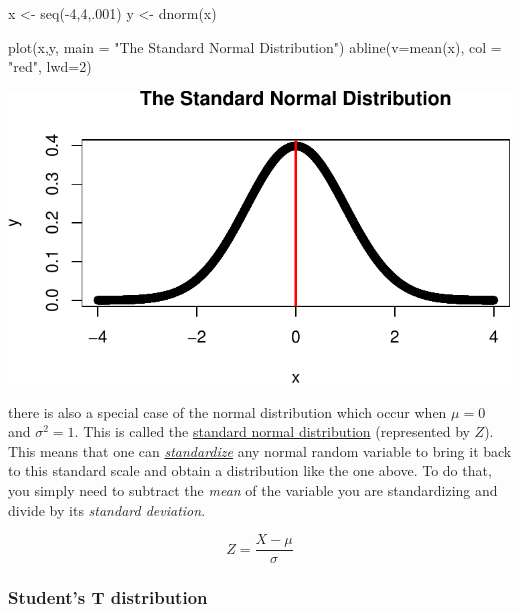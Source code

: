 \documentclass[
  letterpaper,
  DIV=11,
  numbers=noendperiod]{scrartcl}
\newenvironment{Shaded}{\begin{snugshade}}{\end{snugshade}}
\newcommand{\AttributeTok}[1]{\textcolor[rgb]{0.40,0.45,0.13}{#1}}
\newcommand{\DecValTok}[1]{\textcolor[rgb]{0.68,0.00,0.00}{#1}}
\newcommand{\FunctionTok}[1]{\textcolor[rgb]{0.28,0.35,0.67}{#1}}
\newcommand{\NormalTok}[1]{\textcolor[rgb]{0.00,0.23,0.31}{#1}}
\newcommand{\OtherTok}[1]{\textcolor[rgb]{0.00,0.23,0.31}{#1}}
\newcommand{\SpecialCharTok}[1]{\textcolor[rgb]{0.37,0.37,0.37}{#1}}
\newcommand{\StringTok}[1]{\textcolor[rgb]{0.13,0.47,0.30}{#1}}
\begin{document}
\begin{Shaded}
\begin{Highlighting}[]
\NormalTok{x }\OtherTok{\textless{}{-}} \FunctionTok{seq}\NormalTok{(}\SpecialCharTok{{-}}\DecValTok{4}\NormalTok{,}\DecValTok{4}\NormalTok{,.}\DecValTok{001}\NormalTok{)}
\NormalTok{y }\OtherTok{\textless{}{-}} \FunctionTok{dnorm}\NormalTok{(x)}

\FunctionTok{plot}\NormalTok{(x,y, }\AttributeTok{main =} \StringTok{"The Standard Normal Distribution"}\NormalTok{)}
\FunctionTok{abline}\NormalTok{(}\AttributeTok{v=}\FunctionTok{mean}\NormalTok{(x), }\AttributeTok{col =} \StringTok{"red"}\NormalTok{, }\AttributeTok{lwd=}\DecValTok{2}\NormalTok{)}
\end{Highlighting}
\end{Shaded}

\includegraphics{stats_review_files/figure-pdf/unnamed-chunk-18-1.pdf}

there is also a special case of the normal distribution which occur when
\(\mu=0\) and \(\sigma^2=1\). This is called the
\href{https://www.scribbr.com/statistics/standard-normal-distribution/}{standard
normal distribution} (represented by \(Z\)). This means that one can
\href{https://www.listendata.com/2017/04/how-to-standardize-variable-in-regression.html}{\emph{standardize}}
any normal random variable to bring it back to this standard scale and
obtain a distribution like the one above. To do that, you simply need to
subtract the \emph{mean} of the variable you are standardizing and
divide by its \emph{standard deviation}.

\[
Z = \frac{X - \mu}{\sigma}
\]

\subsubsection{Student's T distribution}\label{students-t-distribution}
\end{document}
